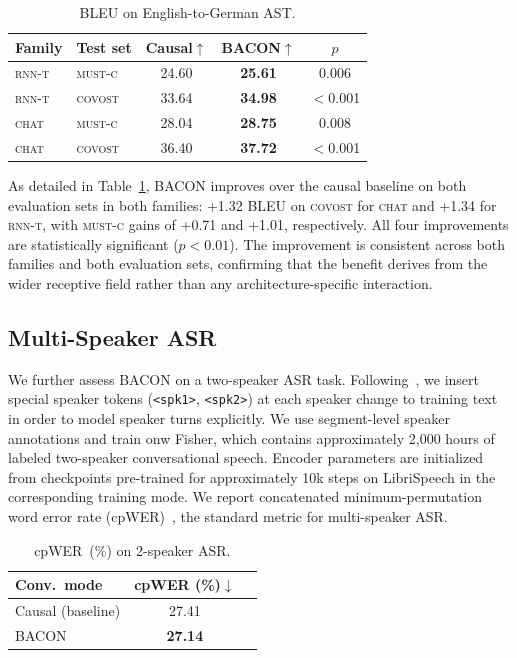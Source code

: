 \documentclass[cameraready]{Interspeech}
\begin{document}
\begin{table}[h]
\centering
\caption{BLEU on English-to-German AST. }
\label{tab:chunk_conv_bleu}
\begin{tabular}{llccc}
\toprule
\textbf{Family} & \textbf{Test set} & \textbf{Causal}$\uparrow$ & \textbf{BACON}$\uparrow$ & $p$ \\
\midrule
\textsc{rnn-t} & \textsc{must-c} & 24.60 & \textbf{25.61} & 0.006 \\
\textsc{rnn-t} & \textsc{covost} & 33.64 & \textbf{34.98} & $<$0.001 \\
\midrule
\textsc{chat} & \textsc{must-c} & 28.04 & \textbf{28.75} & 0.008 \\
\textsc{chat} & \textsc{covost} & 36.40 & \textbf{37.72} & $<$0.001 \\
\bottomrule
\end{tabular}
\end{table}

As detailed in Table~\ref{tab:chunk_conv_bleu}, BACON improves over the causal baseline on both evaluation sets in both families:
+1.32 BLEU on \textsc{covost} for \textsc{chat} and +1.34 for \textsc{rnn-t},
with \textsc{must-c} gains of +0.71 and +1.01, respectively. All four improvements are statistically significant ($p<0.01$).
The improvement is consistent across both families and both evaluation sets, confirming that the
benefit derives from the wider receptive field rather than any
architecture-specific interaction.

\subsection{Multi-Speaker ASR}
\label{subsec:multispk}

We further assess BACON on a two-speaker ASR task.
Following~\cite{wang2024resource}, we insert special speaker
tokens (\texttt{<spk1>}, \texttt{<spk2>}) at each speaker change to training text in order to model
speaker turns explicitly. We use segment-level speaker annotations and train onw
Fisher, which contains approximately 2,000 hours of
labeled two-speaker conversational speech. Encoder parameters are initialized
from checkpoints pre-trained for approximately 10k steps on LibriSpeech in the
corresponding training mode. We report concatenated minimum-permutation word
error rate (cpWER)~\cite{watanabe2020chime}, the standard metric for
multi-speaker ASR.

\begin{table}[h]
\centering
\caption{cpWER~(\%) on 2-speaker ASR.}
\label{tab:multispk}
\begin{tabular}{lcc}
\toprule
\textbf{Conv.\ mode} & \textbf{cpWER (\%)}$\downarrow$ \\
\midrule
Causal (baseline)      & 27.41 \\
BACON                  & \textbf{27.14} \\
\bottomrule
\end{tabular}
\end{table}
\end{document}
